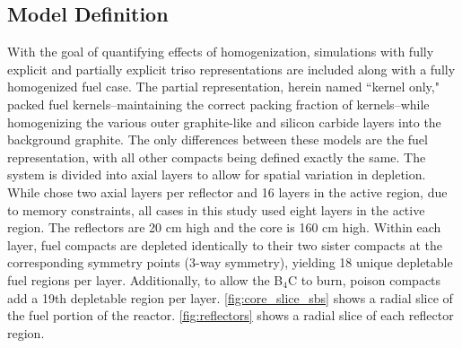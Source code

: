 \documentclass[letterpaper]{physor2024}
\begin{document}
\subsection{Model Definition}\label{sec:model_def}
With the goal of quantifying effects of homogenization, simulations with fully explicit and partially explicit \gls{triso} representations are included along with a fully homogenized fuel case. The partial representation, herein named ``kernel only," packed fuel kernels--maintaining the correct packing fraction of kernels--while homogenizing the various outer graphite-like and silicon carbide layers into the background graphite. The only differences between these models are the fuel representation, with all other compacts being defined exactly the same. The system is divided into axial layers to allow for spatial variation in depletion. While \cite{Abdelhameed-ANS-2022} chose two axial layers per reflector and 16 layers in the active region, due to memory constraints, all cases in this study used eight layers in the active region. The reflectors are 20 cm high and the core is 160 cm high. Within each layer, fuel compacts are depleted identically to their two sister compacts at the corresponding symmetry points (3-way symmetry), yielding 18 unique depletable fuel regions per layer. Additionally, to allow the B$_{4}$C to burn, poison compacts add a 19th depletable region per layer. \cref{fig:core_slice_sbs} shows a radial slice of the fuel portion of the reactor. \cref{fig:reflectors} shows a radial slice of each reflector region.
\end{document}

